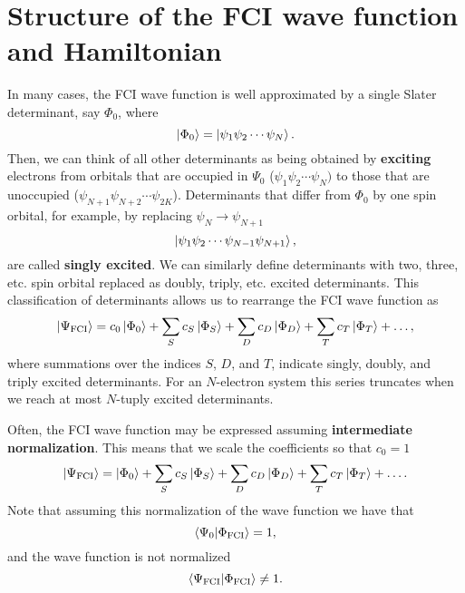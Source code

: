 \documentclass[../Main/chem532-notes.tex]{subfiles}
\begin{document}
\section{Structure of the FCI wave function and Hamiltonian}
In many cases, the FCI wave function is well approximated by a single Slater determinant, say $\Phi_0$, where 
\begin{equation}
\ket{\Phi_0} = \ket{\psi_1 \psi_2 \cdots \psi_N}.
\end{equation}
Then, we can think of all other determinants as being obtained by \textbf{exciting} electrons from orbitals that are occupied in $\Psi_0$ ($\psi_1 \psi_2 \cdots \psi_N)$ to those that are unoccupied ($\psi_{N+1} \psi_{N+2} \cdots \psi_{2K}$).
Determinants that differ from $\Phi_0$ by one spin orbital, for example, by replacing $\psi_N \rightarrow \psi_{N+1}$ 
\begin{equation}
\ket{\psi_1 \psi_2 \cdots \psi_{N -1 }\psi_{N + 1}},
\end{equation}
are called \textbf{singly excited}.
We can similarly define determinants with two, three, etc. spin orbital replaced as doubly, triply, etc. excited determinants.
This classification of determinants allows us to rearrange the FCI wave function as
\begin{equation}
\ket{\Psi_\mathrm{FCI}} = c_0 \ket{\Phi_0} + \sum_S c_S \ket{\Phi_S} + \sum_D c_D \ket{\Phi_D} + \sum_T c_T \ket{\Phi_T} + \ldots,
\end{equation}
where summations over the indices $S$, $D$, and $T$, indicate singly, doubly, and triply excited determinants.
For an $N$-electron system this series truncates when we reach at most $N$-tuply excited determinants.

Often, the FCI wave function may be expressed assuming \textbf{intermediate normalization}.
This means that we scale the coefficients so that $c_0 = 1$
\begin{equation}
\label{eq:fci_intermediate_normalization}
\ket{\Psi_\mathrm{FCI}} = \ket{\Phi_0} + \sum_S c_S \ket{\Phi_S} + \sum_D c_D \ket{\Phi_D} + \sum_T c_T \ket{\Phi_T} + \ldots.
\end{equation}
Note that assuming this normalization of the wave function we have that
\begin{equation}
\braket{\Psi_0| \Phi_\mathrm{FCI} } = 1,
\end{equation}
and the wave function is not normalized
\begin{equation}
\braket{\Psi_\mathrm{FCI} | \Phi_\mathrm{FCI} } \neq 1.
\end{equation}
\end{document}

